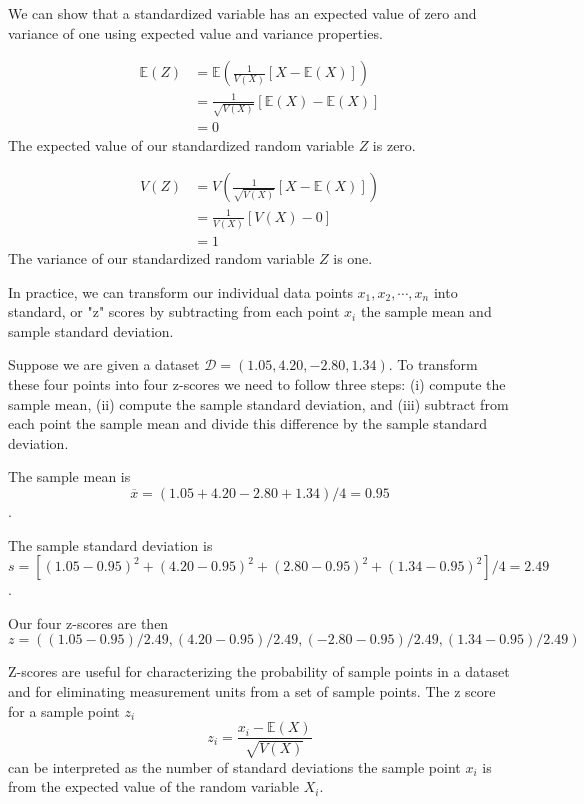 We can show that a standardized variable has an expected value of zero and variance of one using expected value and variance properties. 

\begin{align}
    \mathbb{E}(Z) &= \mathbb{E} \left( \frac{1}{V(X)} \left[X - \mathbb{E}(X)\right]  \right) \\ 
                  &=  \frac{1}{\sqrt{V(X)}} \left[\mathbb{E}(X) - \mathbb{E}(X) \right]  \\
                  &=0
\end{align}
The expected value of our standardized random variable $Z$ is zero.

\begin{align}
    V(Z) &= V \left( \frac{1}{\sqrt{V(X)}} \left[X - \mathbb{E}(X)\right]  \right) \\
         &=  \frac{1}{V(X)} \left[V(X) - 0\right] \\
         &=  1
\end{align}
The variance of our standardized random variable $Z$ is one.

In practice, we can transform our individual data points $x_{1},x_{2},\cdots,x_{n}$ into standard, or "z" scores by subtracting from each point $x_{i}$ the sample mean and sample standard deviation.

\ex Suppose we are given a dataset $\mathcal{D} = (1.05,4.20,-2.80,1.34)$. To transform these four points into four z-scores we need to follow three steps: (i) compute the sample mean, (ii) compute the sample standard deviation, and (iii) subtract from each point the sample mean and divide this difference by the sample standard deviation.

The sample mean is 
\begin{equation*}
    \overline{x} = (1.05+4.20-2.80+1.34)/4 = 0.95
\end{equation*}.

The sample standard deviation is
\begin{equation*}
    s = \left[(1.05-0.95)^2 + (4.20-0.95)^2 + (2.80-0.95)^2 + (1.34-0.95)^2\right]/4 = 2.49
\end{equation*}.

Our four z-scores are then 
\begin{equation*}
    z = ( (1.05-0.95)/2.49,(4.20-0.95)/2.49,(-2.80-0.95)/2.49,(1.34-0.95)/2.49)
\end{equation*}

Z-scores are useful for characterizing the probability of sample points in a dataset and for eliminating measurement units from a set of sample points. 
The z score for a sample point $z_{i}$ 
\begin{equation}
   z_{i} = \frac{x_{i} - \mathbb{E}(X) }{\sqrt{V(X)}}
\end{equation}
can be interpreted as the number of standard deviations the sample point $x_{i}$ is from the expected value of the random variable $X_i$.

